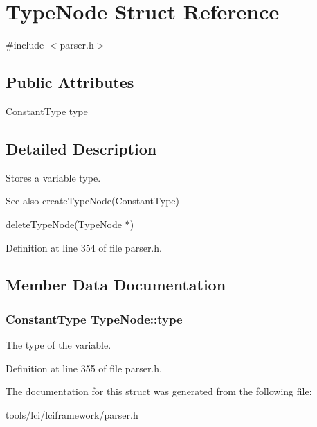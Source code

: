 \hypertarget{struct_type_node}{\section{Type\-Node Struct Reference}
\label{struct_type_node}
}


{\ttfamily \#include $<$parser.\-h$>$}

\subsection*{Public Attributes}
\begin{DoxyCompactItemize}
\item 
Constant\-Type \hyperlink{struct_type_node_abd5fc196a6f39c15eb33e94eec269ac7}{type}
\end{DoxyCompactItemize}


\subsection{Detailed Description}
Stores a variable type.

\begin{DoxySeeAlso}{See also}
create\-Type\-Node(\-Constant\-Type) 

delete\-Type\-Node(\-Type\-Node $\ast$) 
\end{DoxySeeAlso}


Definition at line 354 of file parser.\-h.



\subsection{Member Data Documentation}
\hypertarget{struct_type_node_abd5fc196a6f39c15eb33e94eec269ac7}{
\subsubsection[{type}]{\setlength{\rightskip}{0pt plus 5cm}Constant\-Type {\bf Type\-Node\-::type}}}\label{struct_type_node_abd5fc196a6f39c15eb33e94eec269ac7}
The type of the variable. 

Definition at line 355 of file parser.\-h.



The documentation for this struct was generated from the following file\-:\begin{DoxyCompactItemize}
\item 
tools/lci/lciframework/parser.\-h\end{DoxyCompactItemize}
